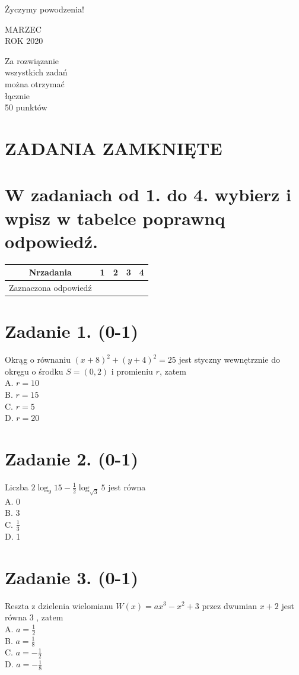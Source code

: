 \documentclass[10pt]{article}
\begin{document}
Życzymy powodzenia!

MARZEC\\
ROK 2020

Za rozwiązanie\\
wszystkich zadań\\
można otrzymać\\
łącznie\\
50 punktów

\section*{ZADANIA ZAMKNIĘTE}
\section*{W zadaniach od 1. do 4. wybierz i wpisz w tabelce poprawnq odpowiedź.}
\begin{center}
\begin{tabular}{|c|c|c|c|c|}
\hline
Nrzadania & 1 & 2 & 3 & 4 \\
\hline
Zaznaczona odpowiedź &  &  &  &  \\
\hline
\end{tabular}
\end{center}

\section*{Zadanie 1. (0-1)}
Okrąg o równaniu \((x+8)^{2}+(y+4)^{2}=25\) jest styczny wewnętrznie do okręgu o środku \(S=(0,2)\) i promieniu \(r\), zatem\\
A. \(r=10\)\\
B. \(r=15\)\\
C. \(r=5\)\\
D. \(r=20\)

\section*{Zadanie 2. (0-1)}
Liczba \(2 \log _{9} 15-\frac{1}{2} \log _{\sqrt{3}} 5\) jest równa\\
A. 0\\
B. 3\\
C. \(\frac{1}{3}\)\\
D. 1

\section*{Zadanie 3. (0-1)}
Reszta z dzielenia wielomianu \(W(x)=a x^{3}-x^{2}+3\) przez dwumian \(x+2\) jest równa 3 , zatem\\
A. \(a=\frac{1}{2}\)\\
B. \(a=\frac{1}{8}\)\\
C. \(a=-\frac{1}{2}\)\\
D. \(a=-\frac{1}{8}\)
\end{document}
